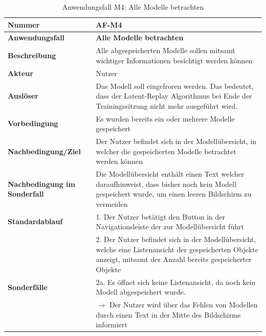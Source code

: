\documentclass[oneside]{ausarbeitung}
\begin{document}
\begin{table}[htbp]
	\centering
	\begin{tabular}{|l|p{80mm}|}
		\hline
		\textbf{Nummer} & \textbf{AF-M4} \\ \hline
		\textbf{Anwendungsfall} & \textbf{Alle Modelle betrachten} \\ \hline
		\textbf{Beschreibung} & Alle abgespeicherten Modelle sollen mitsamt wichtiger Informationen besichtigt werden können \\ \hline
		\textbf{Akteur} & Nutzer \\ \hline
		\textbf{Auslöser} & Das Modell soll eingefroren werden. Das bedeutet, dass der Latent-Replay Algorithmus bei Ende der Trainingssitzung nicht mehr ausgeführt wird.  \\ \hline
		\textbf{Vorbedingung} & Es wurden bereits ein oder mehrere Modelle gespeichert \\ \hline	
		\textbf{Nachbedingung/Ziel} &  Der Nutzer befindet sich in der Modellübersicht, in welcher die gespeicherten Modelle betrachtet werden können\\ \hline
		\textbf{Nachbedingung im Sonderfall} & Die Modellübersicht enthält einen Text welcher daraufhinweist, dass bisher noch kein Modell gespeichert wurde, um einen leeren Bildschirm zu vermeiden \\ \hline
		\textbf{Standardablauf} & 1. Der Nutzer betätigt den Button in der Navigationsleiste der zur Modellübersicht führt \\
		& 2. Der Nutzer befindet sich in der Modellübersicht, welche eine Listenansicht der gespeicherten Objekte anzeigt, mitsamt der Anzahl bereits gespeicherter Objekte \\ \hline
		\textbf{Sonderfälle} & 2a. Es öffnet sich keine Listenansicht, da noch kein Modell abgespeichert wurde. \\ & $\rightarrow$ Der Nutzer wird über das Fehlen von Modellen durch einen Text in der Mitte des Bildschirms informiert \\ \hline
		
	\end{tabular}
	\caption{Anwendungsfall M4: Alle Modelle betrachten}
	\label{tab:use-case-view-models}
\end{table}
\end{document}
